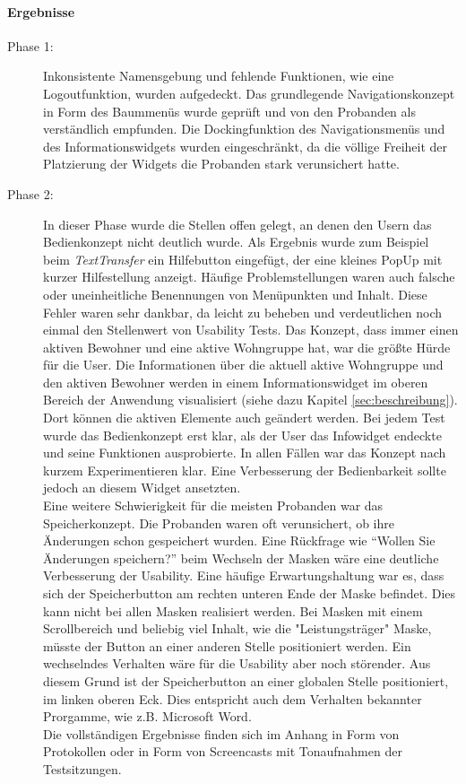 \paragraph*{Ergebnisse}
\begin{description}

\item[Phase 1:] Inkonsistente Namensgebung und fehlende Funktionen, wie eine Logoutfunktion, wurden aufgedeckt. Das grundlegende Navigationskonzept in Form des Baummenüs wurde geprüft und von den Probanden als verständlich empfunden. Die Dockingfunktion des Navigationsmenüs und des Informationswidgets wurden eingeschränkt, da die völlige Freiheit der Platzierung der Widgets die Probanden stark verunsichert hatte. 

\item[Phase 2:] In dieser Phase wurde die Stellen offen gelegt, an denen den Usern das Bedienkonzept nicht deutlich wurde.
Als Ergebnis wurde zum Beispiel beim \textit{TextTransfer} ein Hilfebutton eingefügt, der eine kleines PopUp mit kurzer Hilfestellung anzeigt.
Häufige Problemstellungen waren auch falsche oder uneinheitliche Benennungen von Menüpunkten und Inhalt. Diese Fehler waren sehr dankbar, da leicht zu beheben und verdeutlichen noch einmal den Stellenwert von Usability Tests. Das Konzept, dass \EBP immer einen aktiven Bewohner und eine aktive Wohngruppe hat, war die größte Hürde für die User.
Die Informationen über die aktuell aktive Wohngruppe und den aktiven Bewohner werden in einem Informationswidget im oberen Bereich der Anwendung visualisiert (siehe dazu Kapitel \ref{sec:beschreibung}). Dort können die aktiven Elemente auch geändert werden. Bei jedem Test wurde das Bedienkonzept erst klar, als der User das Infowidget endeckte und seine Funktionen  ausprobierte. In allen Fällen war das 
Konzept nach kurzem Experimentieren klar. Eine Verbesserung der Bedienbarkeit sollte jedoch an diesem Widget ansetzten.\\
Eine weitere Schwierigkeit für die meisten Probanden war das Speicherkonzept. Die Probanden waren oft verunsichert, ob ihre Änderungen schon
gespeichert wurden. Eine Rückfrage wie ``Wollen Sie Änderungen speichern?'' beim Wechseln der Masken wäre eine deutliche Verbesserung der Usability. 
Eine häufige Erwartungshaltung war es, dass sich der Speicherbutton am rechten unteren Ende der Maske befindet. Dies kann nicht bei allen Masken
realisiert werden. Bei Masken mit einem Scrollbereich und beliebig viel Inhalt, wie die "Leistungsträger" Maske, müsste der Button an einer anderen
Stelle positioniert werden. Ein wechselndes Verhalten wäre für die Usability aber noch störender. Aus diesem Grund ist der Speicherbutton an einer
globalen Stelle positioniert, im linken oberen Eck. Dies entspricht auch dem Verhalten bekannter Prorgamme, wie z.B. Microsoft Word.\\
Die vollständigen Ergebnisse finden sich im Anhang in Form von Protokollen oder in Form von Screencasts mit Tonaufnahmen der Testsitzungen.

\end{description}


